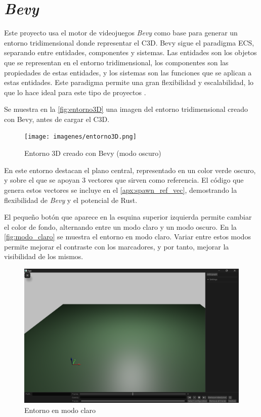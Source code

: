 \section{\textit{Bevy}} \label{sec:bevy}
Este proyecto usa el motor de videojuegos \textit{Bevy} como base para generar un entorno tridimensional donde representar el \ac{C3D}. Bevy sigue el paradigma \ac{ECS}, separando entre entidades, componentes y sistemas. Las entidades son los objetos que se representan en el entorno tridimensional, los componentes son las propiedades de estas entidades, y los sistemas son las funciones que se aplican a estas entidades. Este paradigma permite una gran flexibilidad y escalabilidad, lo que lo hace ideal para este tipo de proyectos \autocite{prdevingDeepdivingEntityComponent2023}.

Se muestra en la \autoref{fig:entorno3D} una imagen del entorno tridimensional creado con Bevy, antes de cargar el \ac{C3D}.


\begin{figure}[H]
  \centering
  \texttt{[image: imagenes/entorno3D.png]}
  \caption{Entorno 3D creado con Bevy (modo oscuro)}
  \label{fig:entorno3D}
\end{figure}

En este entorno destacan el plano central, representado en un color verde oscuro, y sobre el que se apoyan 3 vectores que sirven como referencia. El código que genera estos vectores se incluye en el \autoref{apx:spawn_ref_vec}, demostrando la flexibilidad de \textit{Bevy} y el potencial de Rust. 

El pequeño botón que aparece en la esquina superior izquierda permite cambiar el color de fondo, alternando entre un modo claro y un modo oscuro. En la \autoref{fig:modo_claro} se muestra el entorno en modo claro. Variar entre estos modos permite mejorar el contraste con los marcadores, y por tanto, mejorar la visibilidad de los mismos.

\begin{figure}[H]
  \centering
  \includegraphics[width=\textwidth]{imagenes/modo_claro.png}
  \caption{Entorno en modo claro}
  \label{fig:modo_claro}
\end{figure}

